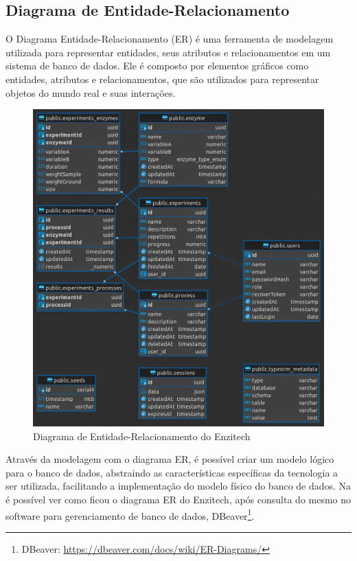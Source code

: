 \subsection{Diagrama de Entidade-Relacionamento}
O Diagrama Entidade-Relacionamento (ER) é uma ferramenta de modelagem utilizada para representar entidades, seus atributos e relacionamentos em um sistema de banco de dados. Ele é composto por elementos gráficos como entidades, atributos e relacionamentos, que são utilizados para representar objetos do mundo real e suas interações.

% 

\begin{figure}[H]
\centering
  \includegraphics[width=\columnwidth]{images/er.jpg}
  \caption{Diagrama de Entidade-Relacionamento do Enzitech}
  \label{fig:der}
\end{figure}

Através da modelagem com o diagrama ER, é possível criar um modelo lógico para o banco de dados, abstraindo as características específicas da tecnologia a ser utilizada, facilitando a implementação do modelo físico do banco de dados. Na  é possível ver como ficou o diagrama ER do Enzitech, após consulta do mesmo no software para gerenciamento de banco de dados, DBeaver\footnote{\label{dbeaver}DBeaver: \url{https://dbeaver.com/docs/wiki/ER-Diagrams/}}.

